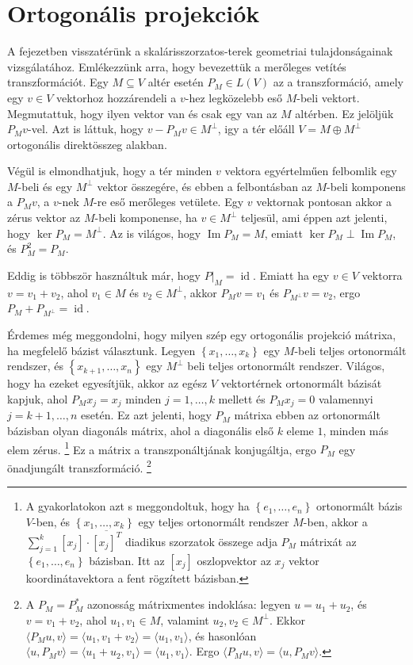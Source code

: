 \documentclass[a4paper, showtrims]{memoir}
\theoremstyle{plain}
\theoremstyle{remark}
\theoremstyle{definition}
\DeclareMathOperator{\id}{id}
\DeclareMathOperator{\im}{Im}
\newcommand{\ip}[2]{\langle#1,#2\rangle}
\begin{document}
\chapter{Ortogonális projekciók}
A fejezetben visszatérünk a skalárisszorzatos-terek geometriai tulajdonságainak vizsgálatához.
Emlékezzünk arra, hogy bevezettük a merőleges vetítés transzformációt.
Egy $M\subseteq V$ altér esetén $P_M\in L\left( V \right)$ az a transzformáció, amely egy $v\in V$ vektorhoz hozzárendeli a $v$-hez legközelebb eső $M$-beli vektort.
Megmutattuk, hogy ilyen vektor van és csak egy van az $M$ altérben.
Ez jelöljük $P_Mv$-vel.
Azt is láttuk, hogy $v-P_Mv\in M^\perp$, igy a tér előáll 
$V=M\oplus M^\perp$ ortogonális direktösszeg alakban.

Végül is elmondhatjuk, hogy a tér minden $v$ vektora egyértelműen felbomlik egy $M$-beli és egy $M^\perp$ vektor összegére,
és ebben a felbontásban az $M$-beli komponens a $P_Mv$, a $v$-nek
$M$-re eső merőleges vetülete.
Egy $v$ vektornak pontosan akkor a zérus vektor az $M$-beli komponense, ha $v\in M^\perp$ teljesül, 
ami éppen azt jelenti, hogy $\ker P_M=M^\perp$.
Az is világos, hogy $\im P_M=M$, 
emiatt $\ker P_M\perp\im P_M$, és $P_M^2=P_M$.

Eddig is többször használtuk már, hogy $P|_M=\id$.
Emiatt ha egy $v\in V$ vektorra $v=v_1+v_2$, ahol $v_1\in M$ és $v_2\in M^\perp$, akkor $P_Mv=v_1$ és $P_{M^\perp}v=v_2$, ergo $P_M+P_{M^\perp}=\id$.

Érdemes még meggondolni, hogy milyen szép egy ortogonális projekció mátrixa, ha megfelelő bázist választunk.
Legyen $\left\{ x_1,\ldots,x_k \right\}$ egy $M$-beli teljes ortonormált rendszer, és $\left\{ x_{k+1},\ldots,x_{n} \right\}$ egy $M^\perp$ beli teljes ortonormált rendszer.
Világos, hogy ha ezeket egyesítjük, akkor az egész $V$ vektortérnek ortonormált bázisát kapjuk, ahol $P_Mx_j=x_j$ minden $j=1,\ldots,k$ mellett és $P_{M}x_j=0$ valamennyi $j=k+1,\ldots,n$ esetén.
Ez azt jelenti, hogy $P_M$ mátrixa ebben az ortonormált bázisban olyan diagonáls mátrix, ahol a diagonális első $k$ eleme $1$, minden más elem zérus.
\footnote{A gyakorlatokon azt s meggondoltuk, hogy ha $\left\{ e_1,\ldots,e_n \right\}$ ortonormált bázis $V$-ben, és $\left\{ x_1,\ldots,x_k \right\}$ egy teljes ortonormált rendszer $M$-ben,
akkor a $\sum_{j=1}^k[x_j]\cdot\overline{[x_j]^T}$ diadikus szorzatok összege adja $P_M$ mátrixát az $\left\{ e_1,\ldots,e_n \right\}$ bázisban. 
Itt az $[x_j]$ oszlopvektor az $x_j$ vektor koordinátavektora a fent rögzített bázisban.}
Ez a mátrix a transzponáltjának konjugáltja, ergo $P_M$ egy önadjungált transzformáció.
\footnote{
    A $P_M=P_M^\ast$ azonosság mátrixmentes indoklása: 
    legyen $u=u_1+u_2$, és $v=v_1+v_2$,
    ahol $u_1,v_1\in M$, valamint $u_2,v_2\in M^\perp$.
    Ekkor 
    $
    \ip{P_Mu}{v}=
    \ip{u_1}{v_1+v_2}
    =
    \ip{u_1}{v_1}
    $,
    és hasonlóan
    $
    \ip{u}{P_Mv}
    =
    \ip{u_1+u_2}{v_1}
    =
    \ip{u_1}{v_1}
    $.
    Ergo 
    $
    \ip{P_Mu}{v}
    =
    \ip{u}{P_Mv}.
    $
}
\end{document}
